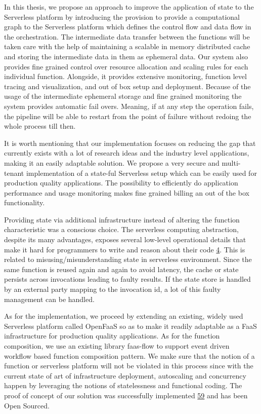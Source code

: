 \documentclass[12pt,titlepage]{article}
\begin{document}
In this thesis, we propose an approach to improve the application of state
to the Serverless platform by introducing the provision to provide a
computational graph to the Serverless platform which defines the control flow
and data flow in the orchestration. The intermediate data transfer between the
functions will be taken care with the help of maintaining a scalable in memory
distributed cache and storing the intermediate data in them as ephemeral data.
Our system also provides fine grained control over resource allocation and
scaling rules for each individual function. Alongside, it provides extensive
monitoring, function level tracing and visualization, and out of box setup and
deployment. Because of the usage of the intermediate ephemeral storage and fine
grained monitoring the system provides automatic fail overs. Meaning, if at any
step the operation fails, the pipeline will be able to 
restart from the point of failure without redoing the whole process till then.

It is worth mentioning that our implementation focuses on reducing the gap that currently
exists with a lot of research ideas and the industry level applications, making
it an easily adaptable solution. We propose a very secure and multi-tenant implementation of a
state-ful Serverless setup which can be easily used for production quality
applications. The possibility to efficiently do application performance and
usage monitoring makes fine grained billing an out of the box functionality.

Providing state via additional infrastructure instead of altering the function
characteristic was a conscious choice. The serverless computing abstraction,
despite its many advantages, exposes several low-level operational details that
make it hard for programmers to write and reason about their code \hyperref[ref:4]{4}. This is
related to misusing/misunderstanding state in serverless environment. Since
the same function is reused again and again to avoid latency, the cache or state
persists across invocations leading to faulty results. If the state store is
handled by an external party mapping to the invocation id, a lot of this faulty
management can be handled.

As for the implementation, we proceed by extending an existing, widely used
Serverless platform called OpenFaaS so as to make it readily adaptable as a FaaS
infrastructure for production quality applications. As for the function
composition, we use an existing library faas-flow to support event driven
workflow based function composition pattern. We make sure that the notion of a
function or serverless platform will not be violated in this process since with
the current state of art of infrastructure deployment, autoscaling and
concurrency happen by leveraging the notions of statelessness and
functional coding. The proof of concept of our solution was successfully
implemented \hyperref[ref:59]{59} and has been Open Sourced.
\end{document}

